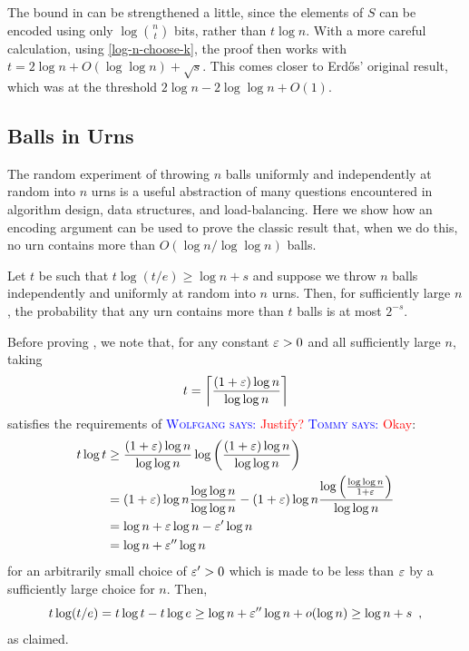 \documentclass{patmorin}
\newcommand{\aremark}[3]{\textcolor{blue}{\textsc{#1 #2:}}
  \textcolor{red}{\textsf{#3}}}
\newcommand{\tommy}[2][says]{\aremark{Tommy}{#1}{#2}}
\newcommand{\wolfgang}[2][says]{\aremark{Wolfgang}{#1}{#2}}
\begin{document}
\begin{rem}
  The bound in  can be strengthened a little,
  since the elements of $S$ can be encoded using only
  $\log\binom{n}{t}$ bits, rather than $t\log n$.  With a more careful
  calculation, using \eqref{log-n-choose-k}, the proof then works with
  $t = 2\log n +O(\log\log n) + \sqrt{s}$. This comes closer to Erdős'
  original result, which was at the threshold $2\log n - 2\log\log n +
  O(1)$.
\end{rem}


\subsection{Balls in Urns}

The random experiment of  throwing $n$ balls uniformly and
independently at random into $n$ urns is a useful abstraction of many
questions encountered in algorithm design, data structures, and 
load-balancing.  Here we
show how an encoding argument can be used to prove the classic result
that, when we do this, no urn contains more than $O(\log n/\log\log
n)$ balls.

\begin{thm}
  Let $t$ be such that $t\log(t/e) \ge \log n + s$ and suppose we
  throw $n$ balls independently and uniformly at random into $n$
  urns. Then, for sufficiently large $n$, the probability that any urn
  contains more than $t$ balls is at most $2^{-s}$.
\end{thm}

Before proving , we note that, for any constant $\varepsilon >0$
and all sufficiently large $n$, taking
\[
  t = {\left\lceil \frac{(1+\varepsilon)\log n}{\log\log n} \right\rceil}
\] 
satisfies the requirements of  \wolfgang{Justify?} \tommy{Okay}:
\begin{align*}
  t \log t &\ge \frac{(1 + \varepsilon) \log n}{\log \log n} \log \left( \frac{(1 + \varepsilon) \log n}{\log \log n}\right) \\
  &= (1 + \varepsilon) \log n \frac{\log \log n}{\log \log n} - (1 + \varepsilon) \log n \frac{\log \left(\frac{\log \log n}{1 + \varepsilon}\right)}{\log \log n} \\
  &= \log n + \varepsilon \log n - \varepsilon' \log n \\
  &= \log n + \varepsilon'' \log n
\end{align*}
for an arbitrarily small choice of $\varepsilon' > 0$ which is made to be
less than $\varepsilon$ by a sufficiently large choice for $n$. Then,
\[
  t \log (t/e) = t \log t - t \log e \ge \log n + \varepsilon'' \log n + o(\log n) \ge \log n + s \enspace ,
\]
as claimed.
\end{document}
